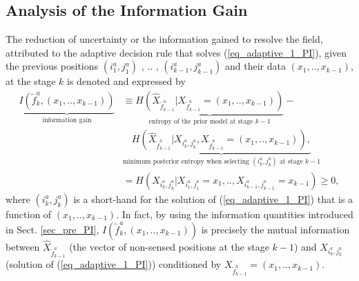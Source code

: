 \subsection{Analysis of the Information Gain}
 The reduction of uncertainty or the information gained to resolve the field, attributed to the adaptive decision rule that solves (\ref{eq_adaptive_1_PI}), given the previous positions  $(i^a_1,j^a_1)$ , $..$ , $(i^a_{k-1},j^a_{k-1})$ and their data $(x_1,..,x_{k-1})$,   at the stage $k$ is denoted and expressed by 
\begin{align} \label{eq_adaptive_4_PI}
	\underbrace{I(\tilde{f}^a_k, (x_1,..,x_{k-1}))}_{\text{information gain}} &\equiv    
 	\underbrace{H(\hat{X}_{\tilde{f}^a_{k-1}}|{X}_{\tilde{f}^a_{k-1}}=(x_1,..,x_{k-1}))}_{\text{entropy of the prior model at stage $k-1$}} -\nonumber\\
	&\underbrace{H(\hat{X}_{\tilde{f}^a_{k-1}}|X_{i^a_k,j^a_k},{X}_{\tilde{f}^a_{k-1}}=(x_1,..,x_{k-1})),}_{\text{minimum posterior entropy when selecting $(i^a_k,j^a_k)$ at stage $k-1$}} \nonumber\\
	&=H(X_{i^a_k,j^a_k}|X_{i^a_1,j^a_1}=x_1,..,X_{i^a_{k-1},j^a_{k-1}}=x_{k-1}) \geq 0,
\end{align}
where $(i^a_k,j^a_k)$ is a short-hand for the solution of (\ref{eq_adaptive_1_PI}) that is a function of $(x_1,..,x_{k-1})$.  In fact, by using the information quantities introduced in Sect. \ref{sec_pre_PI}, $I(\tilde{f}^a_k, (x_1,..,x_{k-1}))$ is precisely the mutual information between $\hat{X}_{\tilde{f}^a_{k-1}}$ (the vector of non-sensed positions at the stage $k-1$) and $X_{i^a_k,j^a_k}$ (solution of  (\ref{eq_adaptive_1_PI})) conditioned by $X_{\tilde{f}^a_{k-1}}=(x_1,..,x_{k-1})$. 


